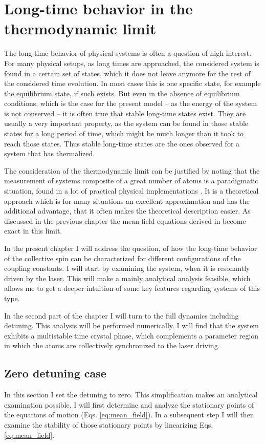 \chapter{Long-time behavior in the thermodynamic limit}\label{ch:mean_field_analysis}
The long time behavior of physical systems is  often a question of high interest. For many physical setups, as long times are approached, the considered system is found in a certain set of states, which it does not leave anymore for the rest of the considered time evolution. In most cases this is one specific state, for example the equilibrium state, if such exists. But even in the absence of equilibrium conditions, which is the case for the present model -- as the energy of the system is not conserved -- it is often true that stable long-time states exist. They are usually a very important property, as the system can be found in those stable states for a long period of time, which might be much longer than it took to reach those states. Thus stable long-time states are the ones observed for a system that has thermalized. 

The consideration of the thermodynamic limit can be justified by noting that the measurement of systems composite of a great number of atoms is a paradigmatic situation, found in a lot of practical physical implementations \cite{mattes_long-range_2025,choi_observation_2017}. It is a theoretical approach which is for many situations an excellent approximation and has the additional advantage, that it often makes the theoretical description easier. As discussed in the previous chapter the mean field equations derived in  become exact in this limit.

In the present chapter I will address the question, of how the long-time behavior of the collective spin can be characterized for different configurations of the coupling constants. I will start by examining the system, when it is resonantly driven by the laser. This will make a mainly analytical analysis feasible, which allows me to get a deeper intuition of some key features regarding systems of this type.

In the second part of the chapter I will turn to the full dynamics including detuning. This analysis will be performed numerically. I will find that the system exhibits a multistable time crystal phase, which complements a parameter region in which the atoms are collectively synchronized to the laser driving.

\section{Zero detuning case}\label{sec:zero_detuning}
In this section I set the detuning to zero. This simplification makes an analytical examination possible. I will first determine and analyze the stationary points of the equations of motion (Eqs. \ref{eq:mean_field}). In a subsequent step I will then examine the stability of those stationary points by linearizing Eqs. \ref{eq:mean_field}.
